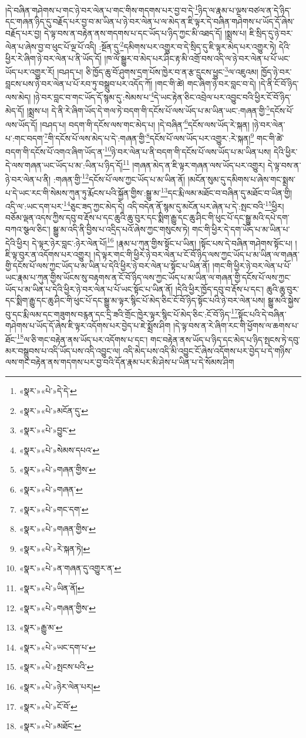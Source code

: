 །དེ་བཞིན་གཤེགས་པ་གང་ཉེ་བར་ལེན་པ་གང་གིས་གདགས་པར་བྱ་བ་དེ་\footnote{«སྣར་»«པེ་»དེ་དེ་}ཉིད་ལ་རྣམ་པ་ལྔས་བཙལ་ན་དེ་ཉིད་དང་གཞན་ཉིད་དུ་བརྗོད་པར་བྱ་བ་མ་ཡིན་པ་ཉེ་བར་ལེན་པ་ལ་མེད་ན་ཇི་ལྟར་དེ་བཞིན་གཤེགས་པ་ཡོད་དོ་ཞེས་བརྗོད་པར་བྱ། དེ་ལྟ་བས་ན་བརྟེན་ནས་གདགས་པ་དང་ཡོད་པ་ཉིད་ཀྱང་མི་འཐད་དོ། །སྨྲས་པ། ཇི་སྲིད་དུ་ཉེ་བར་ལེན་པ་ཞེས་བྱ་བ་ཕུང་པོ་ལྔ་པོ་འདི། :སྔོན་དུ་\footnote{«སྣར་»«པེ་»མངོན་དུ་}དམིགས་པར་འགྱུར་བ་དེ་སྲིད་དུ་ཇི་ལྟར་མེད་པར་འགྱུར་ཏེ། དེའི་ཕྱིར་རེ་ཞིག་ཉེ་བར་ལེན་པ་ནི་ཡོད་དོ། །ཁ་ལོ་སྒྱུར་བ་མེད་པར་ཤིང་རྟ་མི་འགྲོ་བས་འདི་ལ་ཉེ་བར་ལེན་པ་པོ་ཡང་ཡོད་པར་འགྱུར་རོ། །བཤད་པ། ཅི་ཁྱོད་ཆུ་བོ་ཤུགས་དྲག་པོས་ཁྱེར་བ་ན་རྩ་དྲུངས་ཕྱུང་\footnote{«སྣར་»«པེ་»བྱུང་}ལ་འཇུའམ། ཁྱོད་ཉེ་བར་བླངས་པས་ཉེ་བར་ལེན་པ་པོ་རབ་ཏུ་བསྒྲུབ་པར་འདོད་ཀོ། །གང་གི་ཚེ། གང་ཞིག་ཉེ་བར་བླང་བ་དེ། །དེ་ནི་ངོ་བོ་ཉིད་ལས་མེད། །ཉེ་བར་བླང་བ་གང་ཡོད་དོ་སྙམ་དུ་:སེམས་པ་\footnote{«སྣར་»«པེ་»སེམས་དཔའ་}དེ་ཡང་རྟེན་ཅིང་འབྲེལ་པར་འབྱུང་བའི་ཕྱིར་ངོ་བོ་ཉིད་མེད་དོ། །སྨྲས་པ། དེ་ནི་རེ་ཞིག་ཡོད་དེ་གལ་ཏེ་བདག་གི་དངོས་པོ་ལས་ཡོད་པ་མ་ཡིན་ཡང་:གཞན་གྱི་\footnote{«སྣར་»«པེ་»གཞན་གྱིས་}དངོས་པོ་ལས་ཡོད་དོ། །བཤད་པ། བདག་གི་དངོས་ལས་གང་མེད་པ། །དེ་བཞིན་\footnote{«སྣར་»«པེ་»གཞན་}དངོས་ལས་ཡོད་རེ་སྐན། །ཉེ་བར་ལེན་པ་:གང་བདག་\footnote{«སྣར་»«པེ་»གང་དག་}གི་དངོས་པོ་ལས་མེད་པ་དེ་:གཞན་གྱི་\footnote{«སྣར་»«པེ་»གཞན་གྱིས་}དངོས་པོ་ལས་ཡོད་པར་འགྱུར་:རེ་སྐན།\footnote{«སྣར་»«པེ་»རེ་སྐན་ཏེ།} གང་གི་ཚེ་བདག་གི་དངོས་པོ་འགའ་ཞིག་ཡོད་ན་\footnote{«སྣར་»«པེ་»ན་གཞན་དུ་འགྱུར་ན་}ཉེ་བར་ལེན་པ་ནི་བདག་གི་དངོས་པོ་ལས་ཡོད་པ་མ་ཡིན་པས། དེའི་ཕྱིར་དེ་ལས་གཞན་ཡང་ཡོད་པ་མ་:ཡིན་པ་ཉིད་དོ།\footnote{«སྣར་»«པེ་»ཡིན་ནོ།} །གཞན་མེད་ན་ཇི་ལྟར་གཞན་ལས་ཡོད་པར་འགྱུར། དེ་ལྟ་བས་ན་ཉེ་བར་ལེན་པ་ནི། :གཞན་གྱི་\footnote{«སྣར་»«པེ་»གཞན་གྱིས་}དངོས་པོ་ལས་ཀྱང་ཡོད་པ་མ་ཡིན་ནོ། །མངོན་སུམ་དུ་དམིགས་པ་ཞེས་གང་སྨྲས་པ་དེ་ཡང་རང་གི་སེམས་ཀུན་ཏུ་རྨོངས་པའི་སྐྱོན་གྱིས་:སྒྱུ་མ་\footnote{«སྣར་»རྒྱུ་མ་}དང་རྨི་ལམ་མཐོང་བ་བཞིན་དུ་མཐོང་བ་ཡིན་གྱི། འདི་ལ་:ཡང་དག་པར་\footnote{«སྣར་»«པེ་»ཡང་དག་པ་}ཅུང་ཟད་ཀྱང་མེད་དེ། འདི་བདེན་ནོ་སྙམ་དུ་མངོན་པར་ཞེན་པ་དེ་:སྤང་བའི་\footnote{«སྣར་»«པེ་»སྤངས་པའི་}ཕྱིར། བཅོམ་ལྡན་འདས་ཀྱིས་དབུ་བ་རྡོས་པ་དང་ཆུའི་ཆུ་བུར་དང་སྨིག་རྒྱུ་དང་ཆུ་ཤིང་གི་ཕུང་པོ་དང་སྒྱུ་མའི་དཔེ་དག་བཀའ་སྩལ་ཅིང་། སྒྱུ་མ་འདི་ནི་བྱིས་པ་འདྲིད་པའོ་ཞེས་ཀྱང་གསུངས་ཏེ། གང་གི་ཕྱིར་དེ་དག་ཡོད་པ་མ་ཡིན་པ་དེའི་ཕྱིར། དེ་ལྟར་ཉེར་བླང་:ཉེར་ལེན་པོ།\footnote{«སྣར་»«པེ་»ཉེར་ལེན་པར།} །རྣམ་པ་ཀུན་གྱིས་སྟོང་པ་ཡིན། །སྟོང་པས་དེ་བཞིན་གཤེགས་སྟོང་པ། །ཇི་ལྟ་བུར་ན་འདོགས་པར་འགྱུར། །དེ་ལྟར་གང་གི་ཕྱིར་ཉེ་བར་ལེན་པ་ངོ་བོ་ཉིད་ལས་ཀྱང་ཡོད་པ་མ་ཡིན་ལ་གཞན་གྱི་དངོས་པོ་ལས་ཀྱང་ཡོད་པ་མ་ཡིན་པ་དེའི་ཕྱིར་ཉེ་བར་ལེན་པ་སྟོང་པ་ཡིན་ནོ། །གང་གི་ཕྱིར་ཉེ་བར་ལེན་པ་པོ་ཡང་རྣམ་པ་ཀུན་གྱིས་ཡོངས་སུ་བརྟགས་ན་ངོ་བོ་ཉིད་ལས་ཀྱང་ཡོད་པ་མ་ཡིན་ལ་གཞན་གྱི་དངོས་པོ་ལས་ཀྱང་ཡོད་པ་མ་ཡིན་པ་དེའི་ཕྱིར་ཉེ་བར་ལེན་པ་པོ་ཡང་སྟོང་པ་ཡིན་ནོ། །དེའི་ཕྱིར་ཁྱོད་དབུ་བ་རྡོས་པ་དང་། ཆུའི་ཆུ་བུར་དང་སྨིག་རྒྱུ་དང་ཆུ་ཤིང་གི་ཕུང་པོ་དང་སྒྱུ་མ་ལྟར་སྙིང་པོ་མེད་ཅིང་ངོ་བོ་ཉིད་སྟོང་པའི་ཉེ་བར་ལེན་པས། སྒྱུ་མའི་སྐྱེས་བུ་དང་རྨི་ལམ་དང་གཟུགས་བརྙན་དང་དྲི་ཟའི་གྲོང་ཁྱེར་ལྟར་སྙིང་པོ་མེད་ཅིང་:ངོ་བོ་ཉིད་\footnote{«སྣར་»«པེ་»ངོ་བོ་}སྟོང་པའི་དེ་བཞིན་གཤེགས་པ་ཡོད་དོ་ཞེས་ཇི་ལྟར་འདོགས་པར་བྱེད་པ་ཇེ་སྨྲོས་ཤིག །དེ་ལྟ་བས་ན་རེ་ཞིག་རང་གི་ཕྱོགས་ལ་ཆགས་པ་ཐོང་\footnote{«སྣར་»«པེ་»མཐོང་}ལ་ཅི་གང་བརྟེན་ནས་ཡོད་པར་འདོགས་པ་དང་། གང་བརྟེན་ནས་ཡོད་པ་ཉིད་དང་མེད་པ་ཉིད་སྤངས་ཏེ་དབུ་མར་བསྒྲུབས་པ་འདི་ཡོད་པས་འདི་འབྱུང་ལ། འདི་མེད་པས་འདི་མི་འབྱུང་ངོ་ཞེས་འདོགས་པར་བྱེད་པ་དེ་གཉིས་ལས་གང་བརྟེན་ནས་གདགས་པར་བྱ་བའི་དོན་རྣམ་པར་མི་ཤེས་པ་ཡིན་པ་དེ་སོམས་ཤིག 